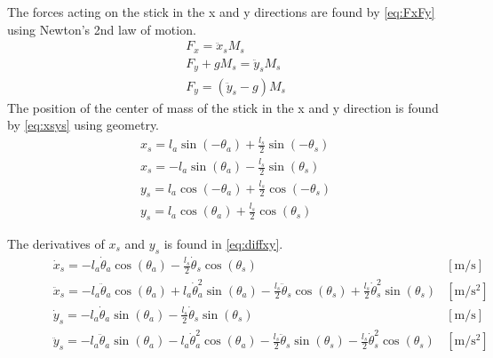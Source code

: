 The forces acting on the stick in the x and y directions are found by \autoref{eq:FxFy} using Newton's 2nd law of motion.
\begin{subequations}  \label{eq:FxFy}
\begin{flalign}
	& F_x=\ddot{x}_sM_s  \\
	& F_y+gM_s=\ddot{y}_sM_s  \\
	& F_y=\left(\ddot{y}_s-g\right)M_s
\end{flalign}
\end{subequations}
\startexplain
\stopexplain
The position of the center of mass of the stick in the x and y direction is found by \autoref{eq:xsys} using geometry.
\begin{subequations}\label{eq:xsys} 
\begin{flalign}
& x_s=l_a\sin (-\theta_a)+\frac{l_s}{2} \sin (-\theta_s) \\
& x_s=-l_a\sin (\theta_a)-\frac{l_s}{2} \sin (\theta_s) \\
& y_s = l_a\cos (-\theta_a)+\frac{l_s}{2} \cos(-\theta_s) \\
& y_s = l_a\cos (\theta_a)+\frac{l_s}{2} \cos(\theta_s) 
\end{flalign}
\end{subequations}

The derivatives of $x_s$ and $y_s$ is found in \autoref{eq:diffxy}.
\begin{subequations}\label{eq:diffxy} 
\begin{flalign}
\hspace{30pt} & \dot{x}_s=-l_a\dot{\theta}_a\cos(\theta_a)-\frac{l_s}{2}\dot{\theta}_s\cos(\theta_s) & [\si{\meter\per\second}] \\
& \ddot{x}_s=-l_a\ddot{\theta}_a\cos(\theta_a)+l_a\dot{\theta}_a^2\sin(\theta_a)-\frac{l_s}{2}\ddot{\theta}_s\cos(\theta_s)+\frac{l_s}{2}\dot{\theta}_s^2\sin(\theta_s) & [\si{\meter\per\square\second}] \\
& \dot{y}_s=-l_a \dot{\theta}_a\sin(\theta_a)-\frac{l_s}{2}\dot{\theta}_s\sin(\theta_s) & [\si{\meter\per\second}] \\
& \ddot{y}_s=-l_a\ddot{\theta}_a\sin(\theta_a)-l_a\dot{\theta}_a^2\cos(\theta_a)-\frac{l_s}{2}\ddot{\theta}_s\sin(\theta_s)-\frac{l_s}{2}\dot{\theta}_s^2\cos(\theta_s) & [\si{\meter\per\square\second}]
\end{flalign}
\end{subequations}

